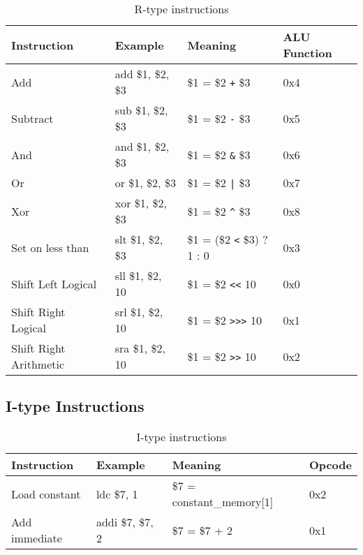 \documentclass[../main/report.tex]{subfiles}
\begin{document}
\begin{table}
    \begin{tabular}{llll}
    \textbf{Instruction}   & \textbf{Example}  & \textbf{Meaning}          & \textbf{ALU Function} \\
    \hline
    \hline
    Add                    & add \$1, \$2, \$3 & \$1 = \$2 \verb/+/ \$3    & 0x4          \\
    Subtract               & sub \$1, \$2, \$3 & \$1 = \$2 \verb/-/ \$3    & 0x5          \\ \hline
    And                    & and \$1, \$2, \$3 & \$1 = \$2 \verb/&/ \$3    & 0x6          \\
    Or                     & or \$1, \$2, \$3  & \$1 = \$2 \verb/|/ \$3    & 0x7          \\
    Xor                    & xor \$1, \$2, \$3 & \$1 = \$2 \verb/^/ \$3    & 0x8          \\ \hline
    Set on less than       & slt \$1, \$2, \$3 & \$1 = (\$2 \verb/</ \$3) ? 1 : 0 & 0x3   \\ \hline
    Shift Left Logical     & sll \$1, \$2, 10  & \$1 = \$2 \verb/<</ 10    & 0x0          \\
    Shift Right Logical    & srl \$1, \$2, 10  & \$1 = \$2 \verb/>>>/ 10   & 0x1          \\
    Shift Right Arithmetic & sra \$1, \$2, 10  & \$1 = \$2 \verb/>>/ 10    & 0x2          \\
    \end{tabular}
    \label{table:r_type_instructions}
    \caption{R-type instructions}
\end{table}

\subsection{I-type Instructions}
\begin{table}
	\begin{tabular}{llll}
		\textbf{Instruction} & \textbf{Example} & \textbf{Meaning} & \textbf{Opcode} \\
		\hline
		\hline
		 Load constant 		 & ldc \$7, 1		& \$7 = constant\_memory[1] & 0x2 \\
		 Add immediate		 & addi \$7, \$7, 2 & \$7 = \$7 + 2 			& 0x1  
	\end{tabular}
	\label{table:i_type_instructions}
	\caption{I-type instructions}
\end{table}
\end{document}
